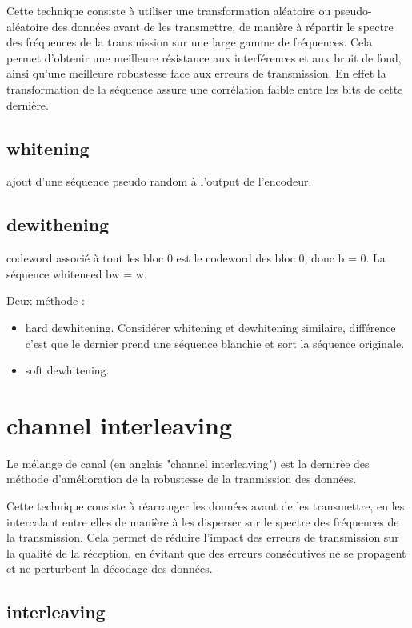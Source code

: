\documentclass[12pt,a4paper,oneside, titlepage]{report}
\begin{document}
Cette technique consiste à utiliser une transformation aléatoire ou pseudo-aléatoire des données avant de les transmettre, de manière à répartir le spectre des fréquences de la transmission sur une large gamme de fréquences. Cela permet d'obtenir une meilleure résistance aux interférences et aux bruit de fond, ainsi qu'une meilleure robustesse face aux erreurs de transmission. En effet la transformation de la séquence assure une corrélation faible entre les bits de cette dernière.

\subsection{whitening}

ajout d'une séquence pseudo random à l'output de l'encodeur.

\subsection{dewithening}

codeword associé à tout les bloc 0 est le codeword des bloc 0, donc b = 0. La séquence whiteneed bw = w.

Deux méthode :

\begin{itemize}
\item hard dewhitening. Considérer whitening et dewhitening similaire, différence c'est que le dernier prend une séquence blanchie et sort la séquence originale.
\item soft dewhitening. 
\end{itemize}


\section{channel interleaving}

Le mélange de canal (en anglais "channel interleaving") est la dernirèe des méthode d'amélioration de la robustesse de la tranmission des données. 

Cette technique consiste à réarranger les données avant de les transmettre, en les intercalant entre elles de manière à les disperser sur le spectre des fréquences de la transmission. Cela permet de réduire l'impact des erreurs de transmission sur la qualité de la réception, en évitant que des erreurs consécutives ne se propagent et ne perturbent la décodage des données.

\subsection{interleaving}
\end{document}
